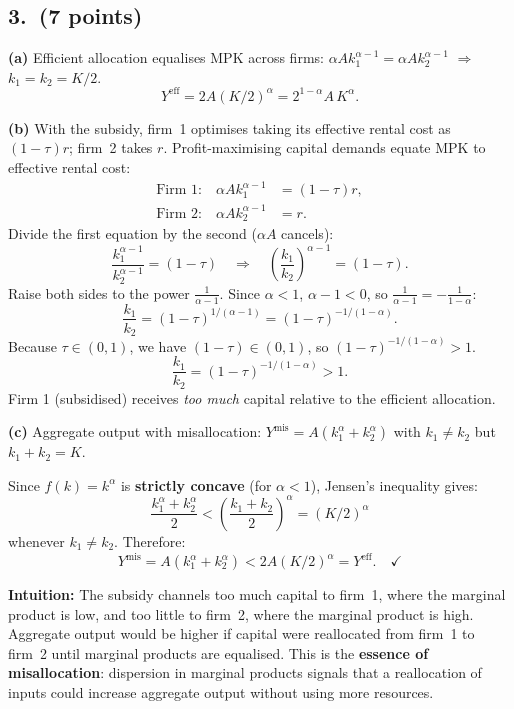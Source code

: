 \documentclass[a4paper,11pt]{article}
\begin{document}
\subsection*{3.\ (7 points)}

\begin{answerbox}
\textbf{(a)} Efficient allocation equalises MPK across firms:
$\alpha A k_1^{\alpha-1} = \alpha A k_2^{\alpha-1}$ $\Rightarrow$ $k_1 = k_2 = K/2$.
\[
    Y^{\mathrm{eff}} = 2A(K/2)^{\alpha} = 2^{1-\alpha}A\,K^{\alpha}.
\]

\textbf{(b)} With the subsidy, firm~1 optimises taking its effective rental cost as
$(1-\tau)r$; firm~2 takes $r$.  Profit-maximising capital demands equate MPK to
effective rental cost:
\begin{align*}
    \text{Firm 1:}\quad \alpha A k_1^{\alpha-1} &= (1-\tau)r, \\
    \text{Firm 2:}\quad \alpha A k_2^{\alpha-1} &= r.
\end{align*}
Divide the first equation by the second ($\alpha A$ cancels):
\[
    \frac{k_1^{\alpha-1}}{k_2^{\alpha-1}} = (1-\tau)
    \quad\Longrightarrow\quad
    \left(\frac{k_1}{k_2}\right)^{\!\alpha-1} = (1-\tau).
\]
Raise both sides to the power $\tfrac{1}{\alpha-1}$.  Since $\alpha < 1$,
$\alpha - 1 < 0$, so $\tfrac{1}{\alpha-1} = -\tfrac{1}{1-\alpha}$:
\[
    \frac{k_1}{k_2}
    = (1-\tau)^{1/(\alpha-1)}
    = (1-\tau)^{-1/(1-\alpha)}.
\]
Because $\tau \in (0,1)$, we have $(1-\tau) \in (0,1)$, so $(1-\tau)^{-1/(1-\alpha)} > 1$.
\[
    \boxed{\frac{k_1}{k_2} = (1-\tau)^{-1/(1-\alpha)} > 1.}
\]
Firm 1 (subsidised) receives \emph{too much} capital relative to the efficient allocation.

\textbf{(c)} Aggregate output with misallocation:
$Y^{\mathrm{mis}} = A(k_1^{\alpha} + k_2^{\alpha})$ with $k_1 \neq k_2$ but
$k_1 + k_2 = K$.

Since $f(k) = k^{\alpha}$ is \textbf{strictly concave} (for $\alpha < 1$), Jensen's
inequality gives:
\[
    \frac{k_1^{\alpha} + k_2^{\alpha}}{2} < \left(\frac{k_1 + k_2}{2}\right)^{\!\alpha}
    = (K/2)^{\alpha}
\]
whenever $k_1 \neq k_2$.  Therefore:
\[
    Y^{\mathrm{mis}} = A(k_1^{\alpha} + k_2^{\alpha}) < 2A(K/2)^{\alpha} = Y^{\mathrm{eff}}.
    \quad\checkmark
\]

\textbf{Intuition:} The subsidy channels too much capital to firm~1, where the marginal
product is low, and too little to firm~2, where the marginal product is high.  Aggregate
output would be higher if capital were reallocated from firm~1 to firm~2 until marginal
products are equalised.  This is the \textbf{essence of misallocation}: dispersion in
marginal products signals that a reallocation of inputs could increase aggregate output
without using more resources.
\end{answerbox}
\end{document}
